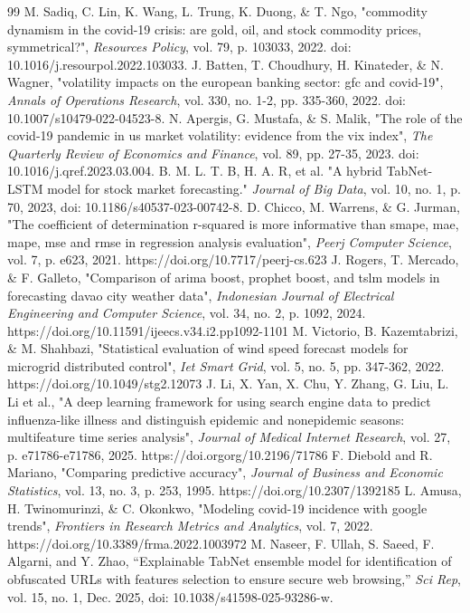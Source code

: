 \documentclass[conference]{IEEEtran}
\begin{document}
\begin{thebibliography}{99}
   M. Sadiq, C. Lin, K. Wang, L. Trung, K. Duong, \& T. Ngo, "commodity dynamism in the covid-19 crisis: are gold, oil, and stock commodity prices, symmetrical?", \textit{Resources Policy}, vol. 79, p. 103033, 2022. doi: 10.1016/j.resourpol.2022.103033.
   J. Batten, T. Choudhury, H. Kinateder, \& N. Wagner, "volatility impacts on the european banking sector: gfc and covid-19", \textit{Annals of Operations Research}, vol. 330, no. 1-2, pp. 335-360, 2022. doi: 10.1007/s10479-022-04523-8.
   N. Apergis, G. Mustafa, \& S. Malik, "The role of the covid-19 pandemic in us market volatility: evidence from the vix index", \textit{The Quarterly Review of Economics and Finance}, vol. 89, pp. 27-35, 2023. doi: 10.1016/j.qref.2023.03.004.
   B. M. L. T. B, H. A. R, et al. "A hybrid TabNet-LSTM model for stock market forecasting." \textit{Journal of Big Data}, vol. 10, no. 1, p. 70, 2023, doi: 10.1186/s40537-023-00742-8.
   D. Chicco, M. Warrens, \& G. Jurman, "The coefficient of determination r-squared is more informative than smape, mae, mape, mse and rmse in regression analysis evaluation", \textit{Peerj Computer Science}, vol. 7, p. e623, 2021. https://doi.org/10.7717/peerj-cs.623
   J. Rogers, T. Mercado, \& F. Galleto, "Comparison of arima boost, prophet boost, and tslm models in forecasting davao city weather data", \textit{Indonesian Journal of Electrical Engineering and Computer Science}, vol. 34, no. 2, p. 1092, 2024. https://doi.org/10.11591/ijeecs.v34.i2.pp1092-1101
   M. Victorio, B. Kazemtabrizi, \& M. Shahbazi, "Statistical evaluation of wind speed forecast models for microgrid distributed control", \textit{Iet Smart Grid}, vol. 5, no. 5, pp. 347-362, 2022. https://doi.org/10.1049/stg2.12073
   J. Li, X. Yan, X. Chu, Y. Zhang, G. Liu, L. Li et al., "A deep learning framework for using search engine data to predict influenza-like illness and distinguish epidemic and nonepidemic seasons: multifeature time series analysis", \textit{Journal of Medical Internet Research}, vol. 27, p. e71786-e71786, 2025. https://doi.orgorg/10.2196/71786
   F. Diebold and R. Mariano, "Comparing predictive accuracy", \textit{Journal of Business and Economic Statistics}, vol. 13, no. 3, p. 253, 1995. https://doi.org/10.2307/1392185
   L. Amusa, H. Twinomurinzi, \& C. Okonkwo, "Modeling covid-19 incidence with google trends", \textit{Frontiers in Research Metrics and Analytics}, vol. 7, 2022. https://doi.org/10.3389/frma.2022.1003972
   M. Naseer, F. Ullah, S. Saeed, F. Algarni, and Y. Zhao, “Explainable TabNet ensemble model for identification of obfuscated URLs with features selection to ensure secure web browsing,” \textit{Sci Rep}, vol. 15, no. 1, Dec. 2025, doi: 10.1038/s41598-025-93286-w.

\end{thebibliography}
\end{document}
